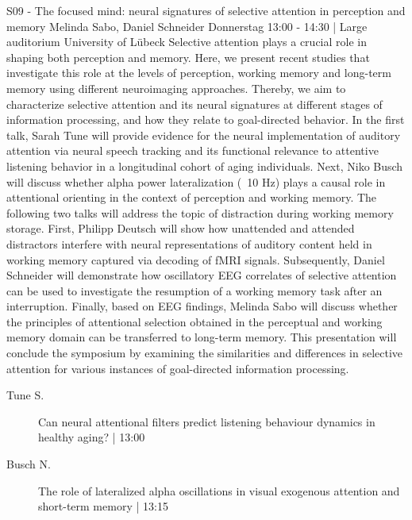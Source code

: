 
            \begin{symposium}
            {S09 - The focused mind: neural signatures of selective attention in perception and memory}
            {Melinda Sabo, Daniel Schneider }
            {Donnerstag 13:00 - 14:30 | Large auditorium}
            {University of Lübeck}
            Selective attention plays a crucial role in shaping both perception and memory. Here, we present recent studies that investigate this role at the levels of perception, working memory and long-term memory using different neuroimaging approaches. Thereby, we aim to characterize selective attention and its neural signatures at different stages of information processing, and how they relate to goal-directed behavior. In the first talk, Sarah Tune will provide evidence for the neural implementation of auditory attention via neural speech tracking and its functional relevance to attentive listening behavior in a longitudinal cohort of aging individuals. Next, Niko Busch will discuss whether alpha power lateralization (~10 Hz) plays a causal role in attentional orienting in the context of perception and working memory. The following two talks will address the topic of distraction during working memory storage. First, Philipp Deutsch will show how unattended and attended distractors interfere with neural representations of auditory content held in working memory captured via decoding of fMRI signals. Subsequently, Daniel Schneider will demonstrate how oscillatory EEG correlates of selective attention can be used to investigate the resumption of a working memory task after an interruption. Finally, based on EEG findings, Melinda Sabo will discuss whether the principles of attentional selection obtained in the perceptual and working memory domain can be transferred to long-term memory. This presentation will conclude the symposium by examining the similarities and differences in selective attention for various instances of goal-directed information processing.
            \begin{description}    
            
                \item [ Tune S.] Can neural attentional filters predict listening behaviour dynamics in healthy aging? \textcolor{mygray}{ | 13:00}    
                
                \item [ Busch N.] The role of lateralized alpha oscillations in visual exogenous attention and short-term memory \textcolor{mygray}{ | 13:15}    
                

\end{description}
\end{symposium}
